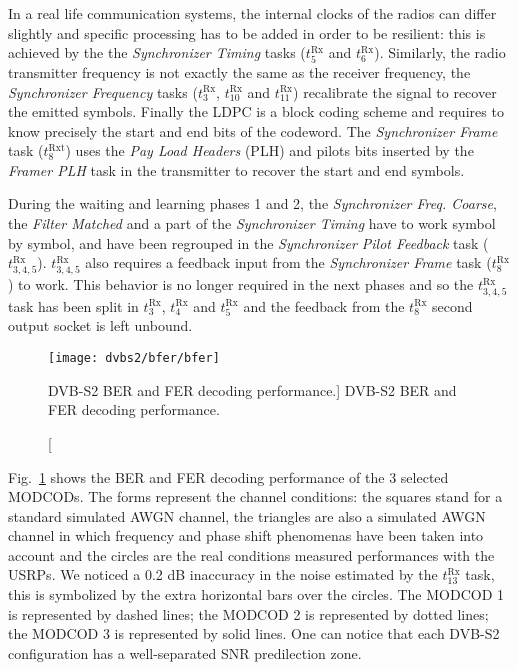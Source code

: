 In a real life communication systems, the internal clocks of the radios can
differ slightly and specific processing has to be added in order to be
resilient: this is achieved by the the \emph{Synchronizer Timing} tasks
($t^\text{Rx}_5$ and $t^\text{Rx}_6$). Similarly, the radio transmitter
frequency is not exactly the same as the receiver frequency, the
\emph{Synchronizer Frequency} tasks ($t^\text{Rx}_3$, $t^\text{Rx}_{10}$ and
$t^\text{Rx}_{11}$) recalibrate the signal to recover the emitted symbols.
Finally the LDPC is a block coding scheme and requires to know precisely the
start and end bits of the codeword. The \emph{Synchronizer Frame} task
($t^\text{Rxt}_8$) uses the \emph{Pay Load Headers} (PLH) and pilots bits
inserted by the \emph{Framer PLH} task in the transmitter to recover the start
and end symbols.

During the waiting and learning phases 1 and 2, the \emph{Synchronizer Freq.
Coarse}, the \emph{Filter Matched} and a part of the \emph{Synchronizer Timing}
have to work symbol by symbol, and have been regrouped in the \emph{Synchronizer
Pilot Feedback} task ($t^\text{Rx}_{3,4,5}$). $t^\text{Rx}_{3,4,5}$ also
requires a feedback input from the \emph{Synchronizer Frame} task
($t^\text{Rx}_8$) to work. This behavior is no longer required in the next
phases and so the $t^\text{Rx}_{3,4,5}$ task has been split in $t^\text{Rx}_3$,
$t^\text{Rx}_4$ and $t^\text{Rx}_5$ and the feedback from the $t^\text{Rx}_8$
second output socket is left unbound.

\begin{figure}[htp]
  \centering
  \texttt{[image: dvbs2/bfer/bfer]}
  \caption
    [DVB-S2 BER and FER decoding performance.]
    {DVB-S2 BER and FER decoding performance.}
  \label{fig:dvbs2_bfer}
\end{figure}

Fig.~\ref{fig:dvbs2_bfer} shows the BER and FER decoding performance of the
3 selected MODCODs. The forms represent the channel conditions: the squares
stand for a standard simulated AWGN channel, the triangles are also a simulated
AWGN channel in which frequency and phase shift phenomenas have been taken into
account and the circles are the real conditions measured performances with the
USRPs. We noticed a 0.2 dB inaccuracy in the noise estimated by the
$t^\text{Rx}_{13}$ task, this is symbolized by the extra horizontal bars over
the circles. The {\color{Paired-1} MODCOD 1} is represented by dashed lines; the
{\color{Paired-3} MODCOD 2} is represented by dotted lines; the
{\color{Paired-5} MODCOD 3} is represented by solid lines. One can notice that
each DVB-S2 configuration has a well-separated SNR predilection zone.

